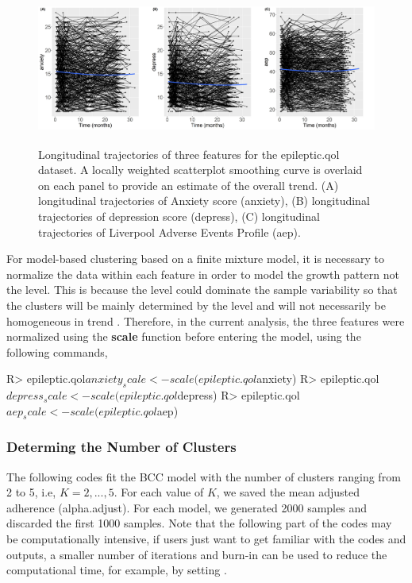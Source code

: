 \begin{figure}[h]
\centering
\includegraphics[width=\textwidth,height=5cm]{./Figures/traj.JPEG}
\caption{\label{fig:traj_demo} Longitudinal trajectories of three features for the epileptic.qol dataset. A locally weighted scatterplot smoothing curve is overlaid on each panel to provide an estimate of the overall trend. (A) longitudinal trajectories of  Anxiety score (anxiety), (B) longitudinal trajectories of depression score (depress), (C) longitudinal trajectories of Liverpool Adverse Events Profile (aep).}
\end{figure}

For model-based clustering based on a finite mixture model, it is necessary to normalize the data within each feature in order to model the growth pattern not the level. This is because the level could dominate the sample variability so that the clusters will be mainly determined by the level and will not necessarily be homogeneous in trend \citep{Heggeseth2018}. Therefore, in the current analysis, the three features were normalized using the \textbf{scale} function before entering the model, using the following commands, 

\begin{example}
R> epileptic.qol$anxiety_scale <- scale(epileptic.qol$anxiety)
R> epileptic.qol$depress_scale <- scale(epileptic.qol$depress)
R> epileptic.qol$aep_scale <- scale(epileptic.qol$aep)
\end{example}

\subsubsection{Determing the Number of Clusters}
The following codes fit the BCC model with the number of clusters ranging from 2 to 5, i.e, $K = 2, ..., 5$. For each value of $K$, we saved the mean adjusted adherence (alpha.adjust). For each model, we generated 2000 samples and discarded the first 1000 samples. Note that the following part of the codes may be computationally intensive, if users just want to get familiar with the codes and outputs, a smaller number of iterations and burn-in can be used to reduce the computational time, for example, by setting .

